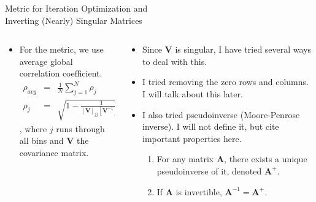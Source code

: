 \documentclass[aspectratio=169]{beamer}
\begin{document}
\begin{frame}{Metric for Iteration Optimization and\\ Inverting (Nearly) Singular Matrices}
\begin{columns}
  \begin{column}{.5\textwidth}
    \begin{itemize}
      \item For the metric, we use average global correlation coefficient\footnotemark[1].
      \begin{eqnarray*}
        \rho_{avg} &=& \frac{1}{N}\sum^{N}_{j=1}\rho_j \\
        \rho_j &=& \sqrt{1-\frac{1}{[\mathbf{V}]_{jj}[\mathbf{V}^{-1}]_{jj}}}
      \end{eqnarray*}
      , where $j$ runs through all bins and $\mathbf{V}$ the covariance matrix.
    \end{itemize}
  \end{column}
  \begin{column}{.5\textwidth}
    \begin{itemize}
      \item Since $\mathbf{V}$ is singular, I have tried several ways to deal with this.
      \item I tried removing the zero rows and columns. I will talk about this later.
      \item I also tried pseudoinverse (Moore-Penrose inverse). I will not define it, but cite important properties here.
      \begin{enumerate}
        \item For any matrix $\mathbf{A}$, there exists a unique pseudoinverse of it, denoted $\mathbf{A}^+$.
        \item If $\mathbf{A}$ is invertible, $\mathbf{A}^{-1}=\mathbf{A}^+$.
      \end{enumerate}
    \end{itemize}
  \end{column}
\end{columns}
\end{frame}
\end{document}
